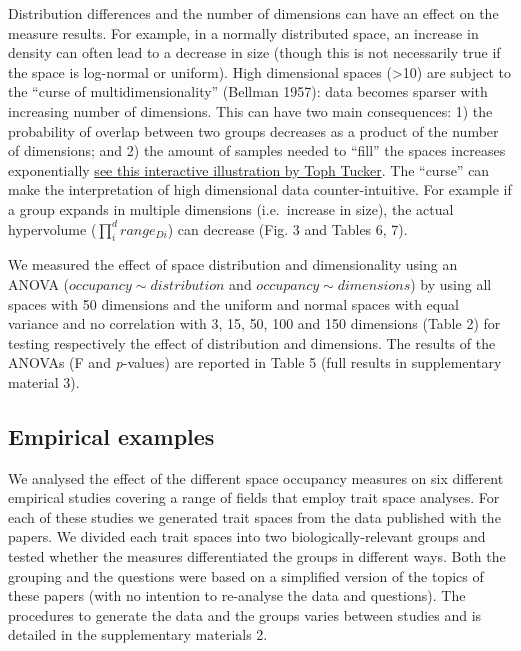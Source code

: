\documentclass[]{article}
\begin{document}
Distribution differences and the number of dimensions can have an effect
on the measure results. For example, in a normally distributed space, an
increase in density can often lead to a decrease in size (though this is
not necessarily true if the space is log-normal or uniform). High
dimensional spaces (\textgreater{}10) are subject to the ``curse of
multidimensionality'' (Bellman 1957): data becomes sparser with
increasing number of dimensions. This can have two main consequences: 1)
the probability of overlap between two groups decreases as a product of
the number of dimensions; and 2) the amount of samples needed to
``fill'' the spaces increases exponentially
\href{https://observablehq.com/@tophtucker/theres-plenty-of-room-in-the-corners}{see
this interactive illustration by Toph Tucker}. The ``curse'' can make
the interpretation of high dimensional data counter-intuitive. For
example if a group expands in multiple dimensions (i.e.~increase in
size), the actual hypervolume (\(\prod_{i}^{d} range_{Di}\)) can
decrease (Fig. 3 and Tables 6, 7).

We measured the effect of space distribution and dimensionality using an
ANOVA (\(occupancy \sim distribution\) and
\(occupancy \sim dimensions\)) by using all spaces with 50 dimensions
and the uniform and normal spaces with equal variance and no correlation
with 3, 15, 50, 100 and 150 dimensions (Table 2) for testing
respectively the effect of distribution and dimensions. The results of
the ANOVAs (F and \emph{p}-values) are reported in Table 5 (full results
in supplementary material 3).

\subsection{Empirical examples}\label{empirical-examples}

We analysed the effect of the different space occupancy measures on six
different empirical studies covering a range of fields that employ trait
space analyses. For each of these studies we generated trait spaces from
the data published with the papers. We divided each trait spaces into
two biologically-relevant groups and tested whether the measures
differentiated the groups in different ways. Both the grouping and the
questions were based on a simplified version of the topics of these
papers (with no intention to re-analyse the data and questions). The
procedures to generate the data and the groups varies between studies
and is detailed in the supplementary materials 2.
\end{document}

